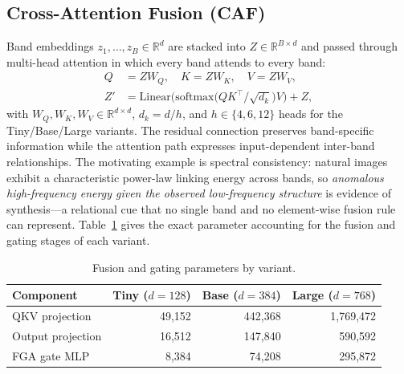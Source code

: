 \documentclass[journal]{IEEEtran}
\begin{document}
\subsection{Cross-Attention Fusion (CAF)}
\label{sec:caf}
Band embeddings $z_1,\dots,z_B \in \mathbb{R}^{d}$ are stacked into $Z \in \mathbb{R}^{B \times d}$ and passed through multi-head attention in which every band attends to every band:
\begin{align}
Q &= ZW_Q, \quad K = ZW_K, \quad V = ZW_V, \label{eq:qkv}\\
Z' &= \mathrm{Linear}\!\big(\mathrm{softmax}\!\big(QK^{\!\top}\!/\sqrt{d_k}\big)V\big) + Z, \label{eq:attn}
\end{align}
with $W_Q, W_K, W_V \in \mathbb{R}^{d \times d}$, $d_k = d/h$, and $h \in \{4, 6, 12\}$ heads for the Tiny/Base/Large variants. The residual connection preserves band-specific information while the attention path expresses input-dependent inter-band relationships. The motivating example is spectral consistency: natural images exhibit a characteristic power-law linking energy across bands, so \emph{anomalous high-frequency energy given the observed low-frequency structure} is evidence of synthesis---a relational cue that no single band and no element-wise fusion rule can represent. Table~\ref{tab:attnparams} gives the exact parameter accounting for the fusion and gating stages of each variant.

\begin{table}[!t]
\renewcommand{\arraystretch}{1.2}
\caption{Fusion and gating parameters by variant.}
\label{tab:attnparams}
\centering
\begin{tabular}{lrrr}
\toprule
Component & Tiny ($d{=}128$) & Base ($d{=}384$) & Large ($d{=}768$) \\
\midrule
QKV projection   & 49{,}152  & 442{,}368 & 1{,}769{,}472 \\
Output projection& 16{,}512  & 147{,}840 & 590{,}592 \\
FGA gate MLP     & 8{,}384   & 74{,}208  & 295{,}872 \\
\bottomrule
\end{tabular}
\end{table}
\end{document}
